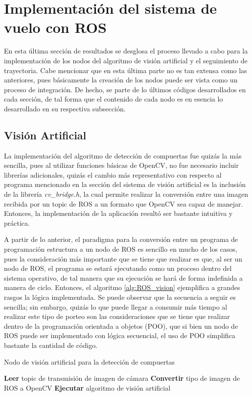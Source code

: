 \chapter{Implementación del sistema de vuelo con ROS}

En esta última sección de resultados se desglosa el proceso llevado a cabo para la implementación de los nodos del algoritmo de visión artificial y el seguimiento de trayectoria. Cabe mencionar que en esta última parte no es tan extensa como las anteriores, pues básicamente la creación de los nodos puede ser vista como un proceso de integración. De hecho, se parte de lo últimos códigos desarrollados en cada sección, de tal forma que el contenido de cada nodo es en esencia lo desarrollado en su respectiva subsección.

\section{Visión Artificial}
La implementación del algoritmo de detección de compuertas fue quizás la más sencilla, pues al utilizar funciones básicas de OpenCV, no fue necesario incluir librerías adicionales, quizás el cambio más representativo con respecto al programa mencionado en la sección del sistema de visión artificial es la inclusión de la librería \textit{cv\_bridge.h}, la cual permite realizar la conversión entre una imagen recibida por un topic de ROS a un formato que OpenCV sea capaz de manejar. Entonces, la implementación de la aplicación resultó ser bastante intuitiva y práctica.

A partir de lo anterior, el paradigma para la conversión entre un programa de programación estructura a un nodo de ROS es sencillo en mucho de los casos, pues la consideración más importante que se tiene que realizar es que, al ser un nodo de ROS, el programa se estará ejecutando como un proceso dentro del sistema operativo, de tal manera que su ejecución se hará de forma indefinida a manera de ciclo. Entonces, el algoritmo \ref{alg:ROS_vision} ejemplifica a grandes rasgos la lógica implementada. Se puede observar que la secuencia a seguir es sencilla; sin embargo, quizás lo que puede llegar a consumir más tiempo al realizar este tipo de porteo son las consideraciones que se tiene que realizar dentro de la programación orientada a objetos (POO), que si bien un nodo de ROS puede ser implementado con lógica secuencial, el uso de POO simplifica bastante la cantidad de código.


\begin{algorithm}
    \caption{Nodo de visión artificial para la detección de compuertas}\label{alg:ROS_vision}
    \begin{algorithmic}
    \State \textbf{Leer} topic de transmisión de imagen de cámara
    \State \textbf{Convertir} tipo de imagen de ROS a OpenCV
    \State \textbf{Ejecutar} algoritmo de visión artificial
    \EndWhile
\end{algorithmic}
\end{algorithm}

